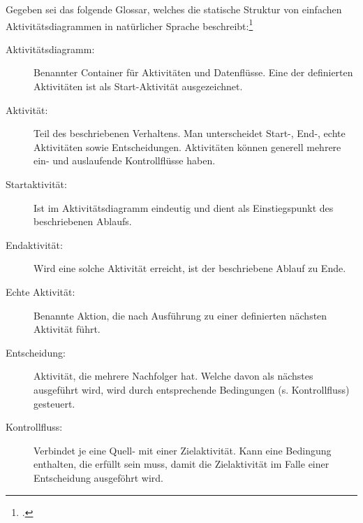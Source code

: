 \documentclass{bschlangaul-aufgabe}
\begin{document}

Gegeben sei das folgende Glossar, welches die statische Struktur von
einfachen Aktivitätsdiagrammen in natürlicher
Sprache beschreibt:\footcite[Thema 2 Teilaufgabe 2 Aufgabe 2]{examen:66116:2017:09}

\begin{description}
\item[Aktivitätsdiagramm:]
Benannter Container für Aktivitäten und Datenflüsse. Eine der
definierten Aktivitäten ist als Start-Aktivität ausgezeichnet.

\item[Aktivität:]
Teil des beschriebenen Verhaltens. Man unterscheidet Start-, \mbox{End-,} echte
Aktivitäten sowie Entscheidungen. Aktivitäten können generell mehrere
ein- und auslaufende Kontrollflüsse haben.

\item[Startaktivität:]
Ist im Aktivitätsdiagramm eindeutig und dient als Einstiegspunkt des
beschriebenen Ablaufs.

\item[Endaktivität:]
Wird eine solche Aktivität erreicht, ist der beschriebene Ablauf zu
Ende.

\item[Echte Aktivität:]
Benannte Aktion, die nach Ausführung zu einer definierten nächsten
Aktivität führt.

\item[Entscheidung:]
Aktivität, die mehrere Nachfolger hat. Welche davon als nächstes
ausgeführt wird, wird durch entsprechende Bedingungen (s. Kontrollfluss)
gesteuert.

\item[Kontrollfluss:]
Verbindet je eine Quell- mit einer Zielaktivität. Kann eine Bedingung
enthalten, die erfüllt sein muss, damit die Zielaktivität im Falle einer
Entscheidung ausgeföhrt wird.

\end{description}
\end{document}
